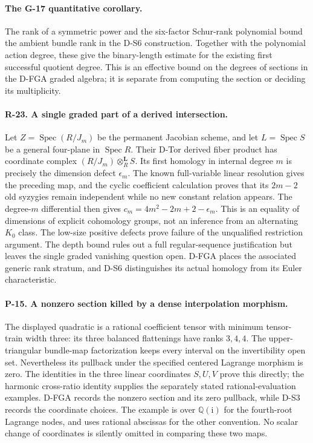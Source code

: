 \paragraph{The G-17 quantitative corollary.}
The rank of a symmetric power and the six-factor Schur-rank polynomial
bound the ambient bundle rank in the D-S6 construction. Together with
the polynomial action degree, these give the binary-length estimate
for the existing first successful quotient degree. This is an effective
bound on the degrees of sections in the D-FGA graded algebra; it is
separate from computing the section or deciding its multiplicity.


\paragraph{R-23. A single graded part of a derived intersection.}
Let $Z=\operatorname{Spec}(R/J_m)$ be the permanent Jacobian scheme,
and let $L=\operatorname{Spec}S$ be a general four-plane in
$\operatorname{Spec}R$. Their D-Tor derived fiber product has
coordinate complex $(R/J_m)\otimes_R^{\mathbf L}S$.
Its first homology in internal degree $m$ is precisely the dimension
defect $\epsilon_m$. The known full-variable linear resolution gives
the preceding map, and the cyclic coefficient calculation proves
that its $2m-2$ old syzygies remain independent while no new constant
relation appears. The degree-$m$ differential then gives
$c_m=4m^2-2m+2-\epsilon_m$. This is an equality of dimensions of
explicit cohomology groups, not an inference from an alternating
$K_0$ class. The low-size positive defects prove failure of the
unqualified restriction argument. The depth bound rules out a full
regular-sequence justification but leaves the single graded
vanishing question open. D-FGA places the associated generic rank
stratum, and D-S6 distinguishes its actual homology from its
Euler characteristic.

\paragraph{P-15. A nonzero section killed by a dense interpolation morphism.}
The displayed quadratic is a rational coefficient tensor with
minimum tensor-train width three: its three balanced flattenings
have ranks $3,4,4$. The upper-triangular bundle-map factorization
keeps every interval on the invertibility open set. Nevertheless
its pullback under the specified centered Lagrange morphism is
zero. The identities in the three linear coordinates $S,U,V$
prove this directly; the harmonic cross-ratio identity supplies
the separately stated rational-evaluation examples. D-FGA records
the nonzero section and its zero pullback, while D-S3 records the
coordinate choices. The example is over $\mathbb Q(\mathrm i)$
for the fourth-root Lagrange nodes, and uses rational abscissas
for the other convention. No scalar change of coordinates is
silently omitted in comparing these two maps.

